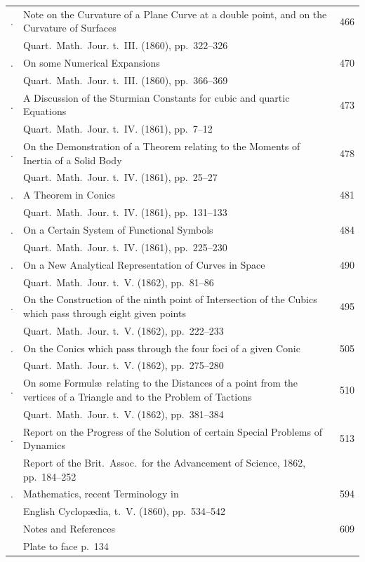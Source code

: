 \documentclass[11pt,a4paper]{book}
\theoremstyle{plain}
\begin{document}
\begin{longtable}{p{0.5in}p{3.8in}p{0.4in}}
\addlinespace
288. & Note on the Curvature of a Plane Curve at a double point, and on the Curvature of Surfaces \dotfill & 466 \\
& \quad Quart.\ Math.\ Jour. t.~III. (1860), pp.~322--326 & \\
\addlinespace
289. & On some Numerical Expansions \dotfill & 470 \\
& \quad Quart.\ Math.\ Jour. t.~III. (1860), pp.~366--369 & \\
\addlinespace
290. & A Discussion of the Sturmian Constants for cubic and quartic Equations \dotfill & 473 \\
& \quad Quart.\ Math.\ Jour. t.~IV. (1861), pp.~7--12 & \\
\addlinespace
291. & On the Demonstration of a Theorem relating to the Moments of Inertia of a Solid Body \dotfill & 478 \\
& \quad Quart.\ Math.\ Jour. t.~IV. (1861), pp.~25--27 & \\
\addlinespace
292. & A Theorem in Conics \dotfill & 481 \\
& \quad Quart.\ Math.\ Jour. t.~IV. (1861), pp.~131--133 & \\
\addlinespace
293. & On a Certain System of Functional Symbols \dotfill & 484 \\
& \quad Quart.\ Math.\ Jour. t.~IV. (1861), pp.~225--230 & \\
\addlinespace
294. & On a New Analytical Representation of Curves in Space \dotfill & 490 \\
& \quad Quart.\ Math.\ Jour. t.~V. (1862), pp.~81--86 & \\
\addlinespace
295. & On the Construction of the ninth point of Intersection of the Cubics which pass through eight given points \dotfill & 495 \\
& \quad Quart.\ Math.\ Jour. t.~V. (1862), pp.~222--233 & \\
\addlinespace
296. & On the Conics which pass through the four foci of a given Conic \dotfill & 505 \\
& \quad Quart.\ Math.\ Jour. t.~V. (1862), pp.~275--280 & \\
\addlinespace
297. & On some Formul\ae\ relating to the Distances of a point from the vertices of a Triangle and to the Problem of Tactions \dotfill & 510 \\
& \quad Quart.\ Math.\ Jour. t.~V. (1862), pp.~381--384 & \\
\addlinespace
298. & Report on the Progress of the Solution of certain Special Problems of Dynamics \dotfill & 513 \\
& \quad Report of the Brit.\ Assoc.\ for the Advancement of Science, 1862, pp.~184--252 & \\
\addlinespace
299. & Mathematics, recent Terminology in \dotfill & 594 \\
& \quad English Cyclop\ae dia, t.~V. (1860), pp.~534--542 & \\
\addlinespace
& Notes and References \dotfill & 609 \\
\addlinespace
& Plate to face p.~134 & \\
\end{longtable}
\newpage
\end{document}
